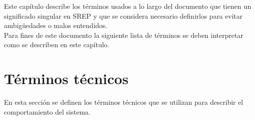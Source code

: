 \label{sec:glosario}


	Este capítulo describe los términos usados a lo largo del documento que tienen un significado singular en SREP y que se considera necesario definirlos para evitar ambigüedades o malos entendidos.\\

	Para fines de este documento la siguiente lista de términos se deben interpretar como se describen en este capítulo.

\section{Términos técnicos}
\label{gls:terminosTecnicos}

	En esta sección se definen los términos técnicos que se utilizan para describir el comportamiento del sistema.
	
